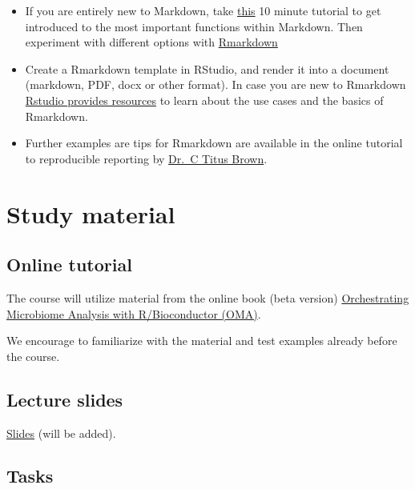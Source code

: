 \documentclass[
  oneside]{book}
\begin{document}
\begin{itemize}
\item
  If you are entirely new to Markdown, take
  \href{https://www.markdowntutorial.com/}{this} 10 minute tutorial to get
  introduced to the most important functions within Markdown. Then
  experiment with different options with
  \href{https://www.rstudio.com/wp-content/uploads/2015/02/rmarkdown-cheatsheet.pdf}{Rmarkdown}
\item
  Create a Rmarkdown template in RStudio, and render it into a
  document (markdown, PDF, docx or other format). In case you are new
  to Rmarkdown \href{https://rmarkdown.rstudio.com/lesson-1.html}{Rstudio provides
  resources} to learn
  about the use cases and the basics of Rmarkdown.
\item
  Further examples are tips for Rmarkdown are available in the
  online tutorial to reproducible reporting by \href{https://rpubs.com/marschmi/RMarkdown}{Dr.~C Titus
  Brown}.
\end{itemize}

\hypertarget{material}{%
\chapter{Study material}\label{material}}

\hypertarget{online-tutorial}{%
\section{Online tutorial}\label{online-tutorial}}

The course will utilize material from the online book (beta version)
\href{https://microbiome.github.io/OMA/}{Orchestrating Microbiome Analysis with R/Bioconductor (OMA)}.

We encourage to familiarize with the material and test examples
already before the course.

\hypertarget{lecture-slides}{%
\section{Lecture slides}\label{lecture-slides}}

\href{https://github.com/microbiome/course_2022_oulu/tree/main/slides}{Slides} (will be added).

\hypertarget{tasks}{%
\section{Tasks}\label{tasks}}
\end{document}
